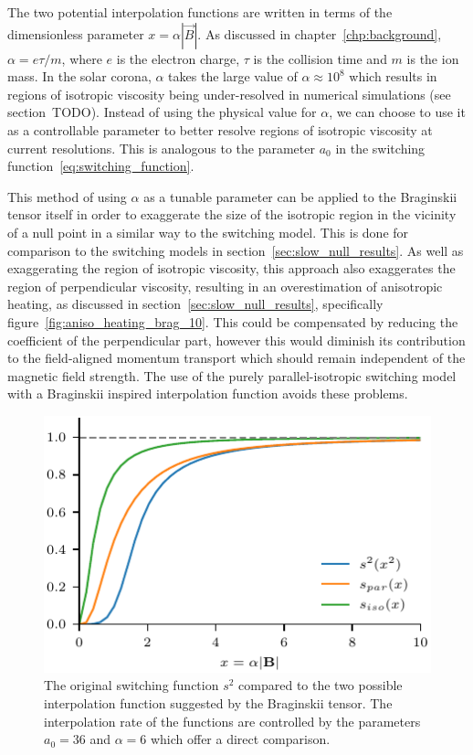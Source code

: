 The two potential interpolation functions are written in terms of the dimensionless parameter $x = \alpha |\vec{B}|$. As discussed in chapter~\ref{chp:background}, $\alpha = e \tau / m$, where $e$ is the electron charge, $\tau$ is the collision time and $m$ is the ion mass. In the solar corona, $\alpha$ takes the large value of $\alpha \approx 10^{8}$ which results in regions of isotropic viscosity being under-resolved in numerical simulations (see section~TODO). Instead of using the physical value for $\alpha$, we can choose to use it as a controllable parameter to better resolve regions of isotropic viscosity at current resolutions. This is analogous to the parameter $a_0$ in the switching function~\ref{eq:switching_function}.

This method of using $\alpha$ as a tunable parameter can be applied to the Braginskii tensor itself in order to exaggerate the size of the isotropic region in the vicinity of a null point in a similar way to the switching model. This is done for comparison to the switching models in section~\ref{sec:slow_null_results}. As well as exaggerating the region of isotropic viscosity, this approach also exaggerates the region of perpendicular viscosity, resulting in an overestimation of anisotropic heating, as discussed in section~\ref{sec:slow_null_results}, specifically figure~\ref{fig:aniso_heating_brag_10}. This could be compensated by reducing the coefficient of the perpendicular part, however this would diminish its contribution to the field-aligned momentum transport which should remain independent of the magnetic field strength. The use of the purely parallel-isotropic switching model with a Braginskii inspired interpolation function avoids these problems. 

\begin{figure}[t]
  \centering
  \includegraphics[width=0.5\linewidth]{alt_switching.pdf}
  \caption{The original switching function $s^2$ compared to the two possible interpolation function suggested by the Braginskii tensor. The interpolation rate of the functions are controlled by the parameters $a_0 = 36$ and $\alpha = 6$ which offer a direct comparison.}%
  \label{fig:alt_switching}
\end{figure}

